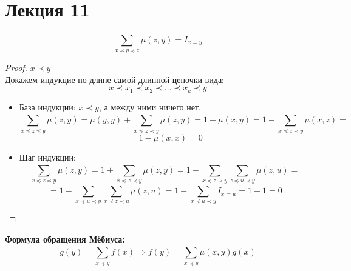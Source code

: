 \section{Лекция 11}
\begin{lemma}
\[
\sum_{x \preceq y \preceq z}^{} \mu(z, y) = I_{x = y}
\]
\end{lemma}
\begin{proof}
$x \prec y$ \\
Докажем индукцие по длине самой \underline{длинной} цепочки вида:
\[
  x \prec x_1 \prec x_2 \prec \ldots \prec x_k \prec y
\]
\begin{itemize}
  \item База индукции: $x \prec y$, а между ними ничего нет.
    \[
    \sum_{x \preceq z \preceq y}^{} \mu(z, y) = \mu(y, y) + \sum_{x \preceq z \prec y}^{} \mu(z, y) = 1 + \mu(x, y) = 1 - \sum_{x \preceq z \prec y}^{} \mu(x, z) =
    \]
    \[
    = 1 - \mu(x, x) = 0
    \]
  \item Шаг индукции: \[
  \sum_{x \preceq z \preceq y}^{} \mu(z, y) = 1 + \sum_{x \preceq z \prec y}^{} \mu(z, y) = 1 - \sum_{x \preceq z \prec y}^{} \sum_{z \preceq u \prec y}^{} \mu(z, u) = 
    \]
    \[
    = 1 - \sum_{x \preceq u \prec y}^{} \sum_{x \preceq z \prec u}^{} \mu(z, u) = 1 - \sum_{x \preceq u \prec y}^{} I_{x = u} = 1 - 1 = 0
    \]
\end{itemize}
\end{proof}
\begin{theorem}
\textbf{Формула обращения Мёбиуса:} \\
\[
g(y) = \sum_{x \preceq y}^{} f(x) \Rightarrow f(y) = \sum_{x \preceq y}^{} \mu(x, y) g(x)
\]
\end{theorem}
